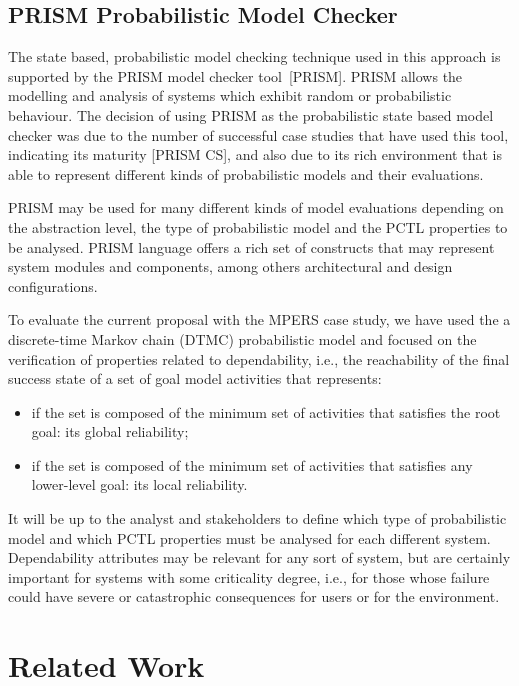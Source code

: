 \section{PRISM Probabilistic Model Checker}

The state based, probabilistic model checking technique used in this approach is supported by the PRISM model checker tool~[PRISM]. PRISM allows the modelling and analysis of systems which exhibit random or probabilistic behaviour. The decision of using PRISM as the probabilistic state based model checker was due to the number of successful case studies that have used this tool, indicating its maturity [PRISM CS], and also due to its rich environment that is able to represent different kinds of probabilistic models and their evaluations.

PRISM may be used for many different kinds of model evaluations depending on the abstraction level, the type of probabilistic model and the PCTL properties to be analysed. PRISM language offers a rich set of constructs that may represent system modules and components, among others architectural and design configurations. 

To evaluate the current proposal with the MPERS case study, we have used the a discrete-time Markov chain (DTMC) probabilistic model and focused on the verification of properties related to dependability, i.e., the reachability of the final success state of a set of goal model activities that represents: 

\begin{itemize}

\item if the set is composed of the minimum set of activities that satisfies the root goal: its global reliability;  

\item if the set is composed of the minimum set of activities that satisfies any lower-level goal: its local reliability.

\end{itemize}

It will be up to the analyst and stakeholders to define which type of probabilistic model and which PCTL properties must be analysed for each different system. Dependability attributes may be relevant for any sort of system, but are certainly important for systems with some criticality degree, i.e., for those whose failure could have severe or catastrophic consequences for users or for the environment.


\chapter{Related Work}\label{ch_related_work}

